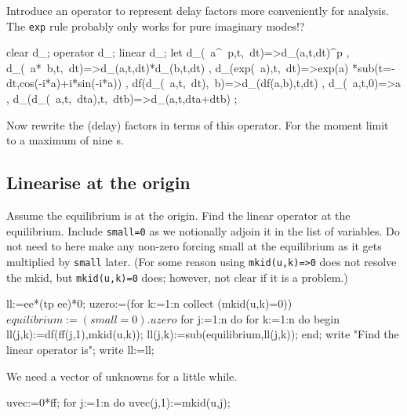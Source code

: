 \documentclass[11pt,a5paper]{article}
\begin{document}
Introduce an operator to represent delay factors more
conveniently for analysis.  The \verb|exp| rule probably
only works for pure imaginary modes!?
\begin{reduce}
clear d_; operator d_; linear d_;
let { d_(~a^~p,t,~dt)=>d_(a,t,dt)^p
    , d_(~a*~b,t,~dt)=>d_(a,t,dt)*d_(b,t,dt)
    , d_(exp(~a),t,~dt)=>exp(a)
        *sub(t=-dt,cos(-i*a)+i*sin(-i*a))
    , df(d_(~a,t,~dt),~b)=>d_(df(a,b),t,dt)
    , d_(~a,t,0)=>a
    , d_(d_(~a,t,~dta),t,~dtb)=>d_(a,t,dta+dtb)
    };
\end{reduce}

Now rewrite the (delay) factors in terms of this operator.
For the moment limit to a maximum of nine \ode{}s.


\subsection{Linearise at the origin}

Assume the equilibrium is at the origin. Find the linear
operator at the equilibrium.  Include \verb|small=0| as we
notionally adjoin it in the list of variables.  Do not need
to here make any non-zero forcing small at the equilibrium
as it gets multiplied by \verb|small| later.  (For some
reason using \verb|mkid(u,k)=>0| does not resolve the mkid,
but \verb|mkid(u,k)=0| does; however, not clear if it is a
problem.)
\begin{reduce}
ll:=ee*(tp ee)*0; %
uzero:=(for k:=1:n collect (mkid(u,k)=0))$
equilibrium:=(small=0).uzero$
for j:=1:n do for k:=1:n do begin 
  ll(j,k):=df(ff(j,1),mkid(u,k));
  ll(j,k):=sub(equilibrium,ll(j,k));
end;
write "Find the linear operator is";
write ll:=ll;
\end{reduce}

We need a vector of unknowns for a little while.
\begin{reduce}
uvec:=0*ff; %
for j:=1:n do uvec(j,1):=mkid(u,j);
\end{reduce}
\end{document}
